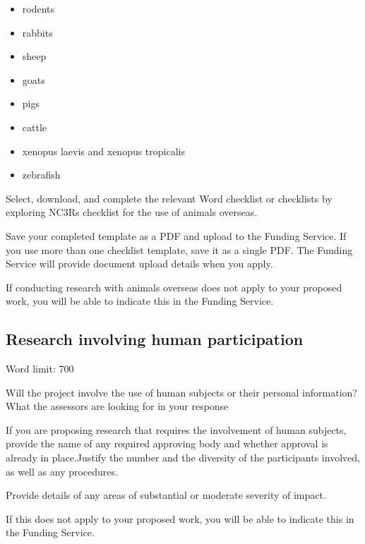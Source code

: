 \documentclass[11pt]{article}
\newenvironment{instruction}{%
    \begin{tcolorbox}[breakable,colback=red!5,colframe=red,title=Instruction]%
	}{%
    	\end{tcolorbox}%
	}
\begin{document}
\begin{instruction}
\begin{itemize}
	\item rodents

	\item rabbits

	\item sheep

	\item goats

	\item pigs

	\item cattle

	\item xenopus laevis and xenopus tropicalis

	\item zebrafish

\end{itemize}

Select, download, and complete the relevant Word checklist or checklists by
exploring NC3Rs checklist for the use of animals overseas.

Save your completed template as a PDF and upload to the Funding Service. If
you use more than one checklist template, save it as a single PDF.
The Funding Service will provide document upload details when you apply.

If conducting research with animals overseas does not apply to your proposed
work, you will be able to indicate this in the Funding Service.

\end{instruction}

\pagebreak
\subsection{Research involving human participation}

\begin{instruction}

Word limit: 700

Will the project involve the use of human subjects or their personal information?
What the assessors are looking for in your response

If you are proposing research that requires the involvement of human subjects,
provide the name of any required approving body and whether approval is
already in place.Justify the number and the diversity of the participants involved, as well as any
procedures.

Provide details of any areas of substantial or moderate severity of impact.

If this does not apply to your proposed work, you will be able to indicate this in
the Funding Service.

\end{instruction}
\end{document}
